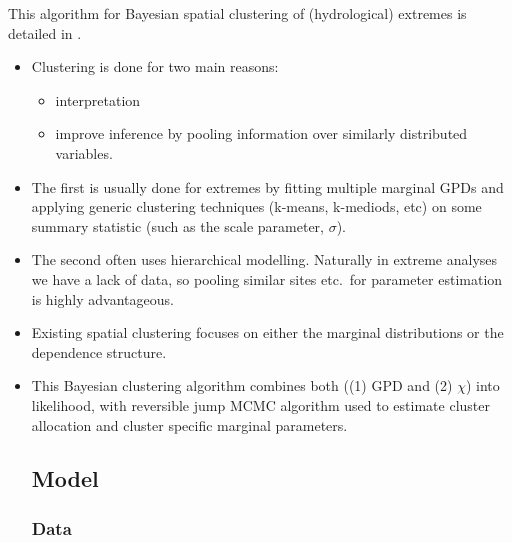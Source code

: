 \documentclass{article}
\begin{document}
This algorithm for Bayesian spatial clustering of (hydrological) extremes is detailed in \cite{Rohrbeck2021}.
\begin{itemize}
  \item Clustering is done for two main reasons:
    \begin{itemize}
      \item interpretation
      \item improve inference by pooling information over similarly distributed variables.
    \end{itemize}
  \item The first is usually done for extremes by fitting multiple marginal GPDs and applying generic clustering techniques (k-means, k-mediods, etc) on some summary statistic (such as the scale parameter, $\sigma$). 
  \item The second often uses hierarchical modelling. Naturally in extreme analyses we have a lack of data, so pooling similar sites etc.\ for parameter estimation is highly advantageous. 
  \item Existing spatial clustering focuses on either the marginal distributions or the dependence structure. 
  \item This Bayesian clustering algorithm combines both ((1) GPD and (2) $\chi$) into likelihood, with reversible jump MCMC algorithm used to estimate cluster allocation and cluster specific marginal parameters. 

\subsection{Model}

\subsubsection{Data}


\end{itemize}
\end{document}
